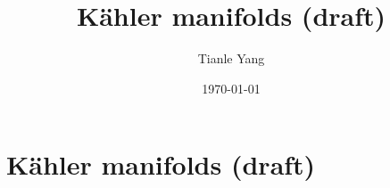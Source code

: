 \documentclass{noteformyself}
\title{Kähler manifolds (draft)}
\author{Tianle Yang}
\date{\today}
\begin{document}
    \maketitle
    \section{Kähler manifolds (draft)}




\end{document}
